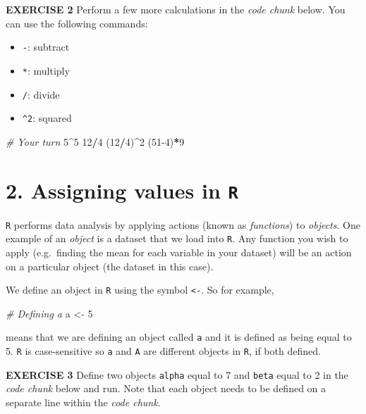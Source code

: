 \documentclass[
]{article}
\newenvironment{Shaded}{\begin{snugshade}}{\end{snugshade}}
\newcommand{\CommentTok}[1]{\textcolor[rgb]{0.56,0.35,0.01}{\textit{#1}}}
\newcommand{\DecValTok}[1]{\textcolor[rgb]{0.00,0.00,0.81}{#1}}
\newcommand{\NormalTok}[1]{#1}
\newcommand{\OperatorTok}[1]{\textcolor[rgb]{0.81,0.36,0.00}{\textbf{#1}}}
\newcommand{\StringTok}[1]{\textcolor[rgb]{0.31,0.60,0.02}{#1}}
\providecommand{\tightlist}{%
  \setlength{\itemsep}{0pt}\setlength{\parskip}{0pt}}
\begin{document}
\textbf{EXERCISE 2} Perform a few more calculations in the \emph{code
chunk} below. You can use the following commands:

\begin{itemize}
\tightlist
\item
  \texttt{-}: subtract
\item
  \texttt{*}: multiply
\item
  \texttt{/}: divide
\item
  \texttt{\^{}2}: squared
\end{itemize}

\begin{Shaded}
\begin{Highlighting}[]
\CommentTok{# Your turn}
\DecValTok{5}\OperatorTok{^}\DecValTok{5}
\DecValTok{12}\OperatorTok{/}\DecValTok{4}
\NormalTok{(}\DecValTok{12}\OperatorTok{/}\DecValTok{4}\NormalTok{)}\OperatorTok{^}\DecValTok{2}
\NormalTok{(}\DecValTok{51-4}\NormalTok{)}\OperatorTok{*}\DecValTok{9}
\end{Highlighting}
\end{Shaded}

\hypertarget{assigning-values-in-r}{%
\section{\texorpdfstring{2. Assigning values in
\texttt{R}}{2. Assigning values in R}}\label{assigning-values-in-r}}

\texttt{R} performs data analysis by applying actions (known as
\emph{functions}) to \emph{objects}. One example of an \emph{object} is
a dataset that we load into \texttt{R}. Any function you wish to apply
(e.g.~finding the mean for each variable in your dataset) will be an
action on a particular object (the dataset in this case).

We define an object in \texttt{R} using the symbol
\texttt{\textless{}-}. So for example,

\begin{Shaded}
\begin{Highlighting}[]
\CommentTok{# Defining a}
\NormalTok{a <-}\StringTok{ }\DecValTok{5}
\end{Highlighting}
\end{Shaded}

means that we are defining an object called \texttt{a} and it is defined
as being equal to 5. \texttt{R} is case-sensitive so \texttt{a} and
\texttt{A} are different objects in \texttt{R}, if both defined.

\textbf{EXERCISE 3} Define two objects \texttt{alpha} equal to 7 and
\texttt{beta} equal to 2 in the \emph{code chunk} below and run. Note
that each object needs to be defined on a separate line within the
\emph{code chunk}.
\end{document}
